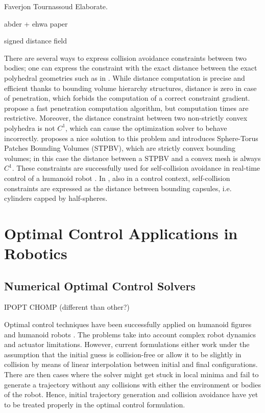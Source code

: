 Faverjon Tournassoud
Elaborate.

abder + ehwa paper

signed distance field

There are several ways to express collision avoidance constraints
between two bodies; one can express the constraint with the exact
distance between the exact polyhedral geometries such as in
\cite{Larsen2000}. While distance computation is precise and efficient
thanks to bounding volume hierarchy structures, distance is zero in
case of penetration, which forbids the computation of a correct
constraint gradient. \cite{Kim2002} propose a fast penetration
computation algorithm, but computation times are
restrictive. Moreover, the distance constraint between two
non-strictly convex polyhedra is not $C^1$, which can cause the
optimization solver to behave incorrectly. \cite{Escande2007} proposes
a nice solution to this problem and introduces Sphere-Torus Patches
Bounding Volumes (STPBV), which are strictly convex bounding volumes;
in this case the distance between a STPBV and a convex mesh is always
$C^1$. These constraints are successfully used for self-collision
avoidance in real-time control of a humanoid robot
\cite{Stasse2008}. In \cite{Kanoun2011}, also in a control context,
self-collision constraints are expressed as the distance between
bounding capsules, i.e. cylinders capped by half-spheres.

\section{Optimal Control Applications in Robotics}

\subsection{Numerical Optimal Control Solvers}

IPOPT
CHOMP (different than other?)

Optimal control techniques have been successfully applied on humanoid
figures \cite{Schultz2010} and humanoid robots \cite{Toussaint2007,
  Lengagne2010}. The problems take into account complex robot dynamics
and actuator limitations. However, current formulations either work
under the assumption that the initial guess is collision-free or allow
it to be slightly in collision by means of linear interpolation
between initial and final configurations. There are then cases where
the solver might get stuck in local minima and fail to generate a
trajectory without any collisions with either the environment or
bodies of the robot. Hence, initial trajectory generation and
collision avoidance have yet to be treated properly in the optimal
control formulation.

